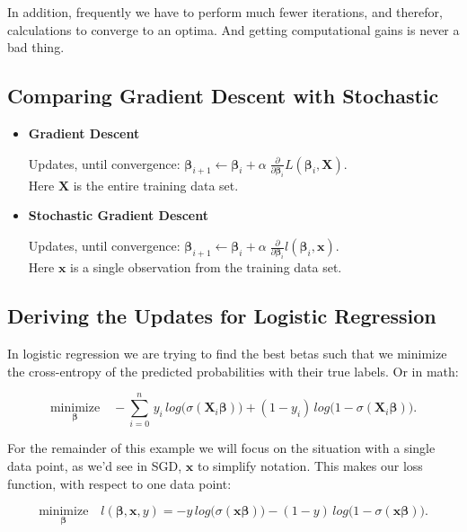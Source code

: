 \documentclass[a4paper, 12pt]{article}
\begin{document}
In addition, frequently we have to perform much fewer iterations, and therefor, calculations to converge to an optima. And getting computational gains is never a bad thing.

\subsection*{Comparing Gradient Descent with Stochastic}

\begin{itemize}
  \item \textbf{Gradient Descent}

    Updates, until convergence: $\bm{\beta}_{i+1} \leftarrow \bm{\beta}_i+ \alpha \; \frac{\partial}{\partial \bm{\beta}_i} L(\bm{\beta}_i, \bm{X})$. \\
    Here $\bm{X}$ is the entire training data set.

  \item \textbf{Stochastic Gradient Descent}

    Updates, until convergence: $\bm{\beta}_{i+1} \leftarrow \bm{\beta}_i+ \alpha \; \frac{\partial}{\partial \bm{\beta}_i} l(\bm{\beta}_i, \bm{x})$. \\
    Here $\bm{x}$ is a single observation from the training data set.
\end{itemize}

\subsection*{Deriving the Updates for Logistic Regression}

In logistic regression we are trying to find the best betas such that we minimize the cross-entropy of the predicted probabilities with their true labels. Or in math:

    $$ \underset{\bm{\beta}}{\text{minimize}} \quad - \sum_{i=0}^n\,
       y_i\, log \big( \sigma(\bm{X}_i \bm{\beta})\big) +
       (1 - y_i)\, log \big( 1 - \sigma(\bm{X}_i \bm{\beta})\big). $$

For the remainder of this example we will focus on the situation with a single data point, as we'd see in SGD, $\bm{x}$ to simplify notation. This makes our loss function, with respect to one data point:

    $$ \underset{\bm{\beta}}{\text{minimize}} \quad l(\bm{\beta}, \bm{x}, y) =
       - y \, log \big( \sigma(\bm{x} \bm{\beta})\big) -
       (1 - y) \, log \big( 1 - \sigma(\bm{x} \bm{\beta})\big). $$
\end{document}
